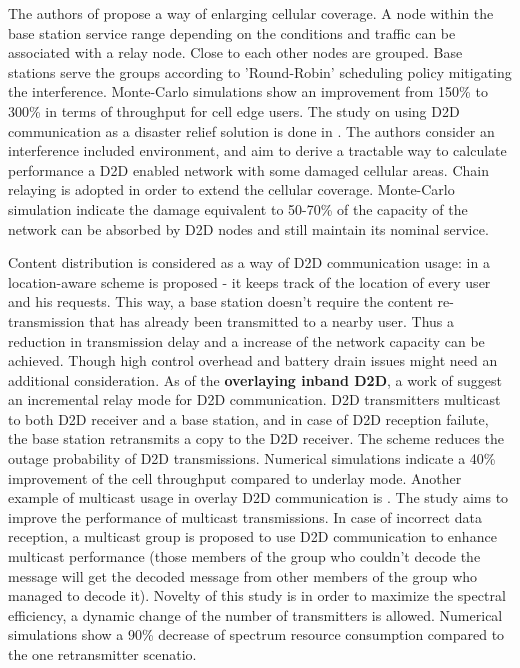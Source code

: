 The authors of \cite {milcom} propose a way of enlarging cellular coverage. 
A node within the base station service range depending on the conditions and traffic can be associated with a relay node. 
Close to each other nodes are grouped. Base stations serve the groups according to 'Round-Robin' scheduling policy mitigating the interference. 
Monte-Carlo simulations show an improvement from 150\% to 300\% in terms of throughput for cell edge users.
The study on using D2D communication as a disaster relief solution is done in \cite{disaster}.
 The authors consider an interference included environment, and aim to derive a tractable way to calculate performance a D2D enabled network with some damaged cellular areas. 
Chain relaying is adopted in order to extend the cellular coverage. 
Monte-Carlo simulation indicate the damage equivalent to 50-70\% of the capacity of the network can be absorbed by D2D nodes and still maintain its nominal service.
\par Content distribution is considered as a way of D2D communication usage: 
in \cite {dataspotting} a location-aware scheme is proposed - it keeps track of the location of every user and his requests. 
This way, a base station doesn't require the content re-transmission that has already been transmitted to a nearby user. 
Thus a reduction in transmission delay and a increase of the network capacity can be achieved. 
Though high control overhead and battery drain issues might need an additional consideration. 
As of the {\bf overlaying inband D2D}, a work of \cite {mumimo} suggest an incremental relay mode for D2D communication. 
D2D transmitters multicast to both D2D receiver and a base station, and in case of D2D reception failute, the base station retransmits a copy to the D2D receiver. 
The scheme reduces the outage probability of D2D transmissions. 
Numerical simulations indicate a 40\% improvement of the cell throughput compared to underlay mode. 
Another example of multicast usage in overlay D2D communication is \cite {intra}. 
The study aims to improve the performance of multicast transmissions. In case of incorrect data reception, a multicast group is proposed to use D2D communication to enhance multicast performance (those members of the group who couldn't decode the message will get the decoded message from other members of the group who managed to decode it). 
Novelty of this study  is in order to maximize the spectral efficiency, a dynamic change of the number of transmitters is allowed. 
Numerical simulations show a 90\% decrease of spectrum resource consumption compared to the one retransmitter scenatio.
